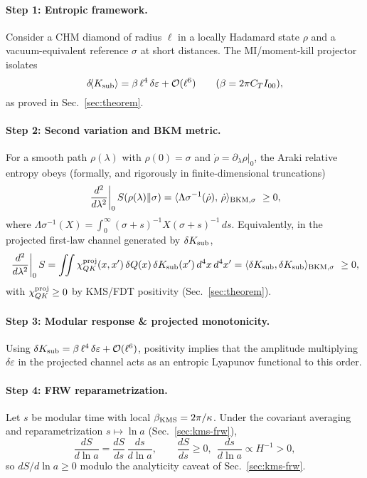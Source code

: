 \documentclass[aps,prd,onecolumn,superscriptaddress,nofootinbib]{revtex4-2}
\def\Omega_\Lambda{OmegaLambda}%
\begin{document}
\paragraph{Step 1: Entropic framework.}
Consider a CHM diamond of radius \(\ell\) in a locally Hadamard state \(\rho\) and a vacuum-equivalent reference \(\sigma\) at short distances. The MI/moment-kill projector isolates
\[
\delta\!\langle K_{\rm sub}\rangle=\beta\,\ell^4\,\delta\varepsilon+\mathcal O(\ell^6)\qquad(\beta=2\pi C_T I_{00}),
\]
as proved in Sec.~\ref{sec:theorem}.

\paragraph{Step 2: Second variation and BKM metric.}
For a smooth path \(\rho(\lambda)\) with \(\rho(0)=\sigma\) and \(\dot\rho=\partial_\lambda\rho|_0\),
the Araki relative entropy obeys (formally, and rigorously in finite-dimensional truncations)
\[
\left.\frac{d^2}{d\lambda^2}\right|_0 S(\rho(\lambda)\Vert\sigma)
=\langle \Omega_\sigma^{-1}(\dot\rho),\,\dot\rho\rangle_{\rm BKM,\sigma}\ \ge 0,
\]
where \(\Omega_\sigma^{-1}(X)=\int_0^\infty\!\!(\sigma+s)^{-1}X(\sigma+s)^{-1}\,ds\).
Equivalently, in the projected first-law channel generated by \(\delta K_{\rm sub}\),
\[
\left.\frac{d^2}{d\lambda^2}\right|_0 S
=\iint \chi^{\rm proj}_{QK}(x,x')\,\delta Q(x)\,\delta K_{\rm sub}(x')\,d^4x\,d^4x'
=\langle \delta K_{\rm sub},\delta K_{\rm sub}\rangle_{\rm BKM,\sigma}\ \ge 0,
\]
with \(\chi^{\rm proj}_{QK}\ge 0\) by KMS/FDT positivity (Sec.~\ref{sec:theorem}).

\paragraph{Step 3: Modular response \& projected monotonicity.}
Using \(\delta K_{\rm sub}=\beta\,\ell^4\,\delta\varepsilon+\mathcal O(\ell^6)\), positivity implies that the amplitude multiplying \(\delta\varepsilon\) in the projected channel acts as an entropic Lyapunov functional to this order.

\paragraph{Step 4: FRW reparametrization.}
Let \(s\) be modular time with local \(\beta_{\rm KMS}=2\pi/\kappa\). Under the covariant averaging and reparametrization \(s\mapsto \ln a\) (Sec.~\ref{sec:kms-frw}),
\[
\frac{dS}{d\ln a}=\frac{dS}{ds}\,\frac{ds}{d\ln a},\qquad \frac{dS}{ds}\ge 0,\ \ \frac{ds}{d\ln a}\propto H^{-1}>0,
\]
so \(dS/d\ln a\ge 0\) modulo the analyticity caveat of Sec.~\ref{sec:kms-frw}.
\end{document}
